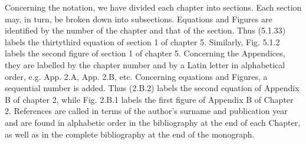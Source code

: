 Concerning the notation, we have divided each chapter into sections. Each section may, in turn, be broken down into subsections. Equations and Figures are identified by the number of the chapter and that of the section. Thus (5.1.33) labels the thirtythird equation of section 1 of chapter 5. Similarly, Fig. 5.1.2 labels the second figure of section 1 of chapter 5. Concerning the Appendices, they are labelled by the chapter number and by a Latin letter in alphabetical order, e.g. App. 2.A, App. 2.B, etc. Concerning equations and Figures, a sequential number is added. Thus (2.B.2) labels the second equation of Appendix B of chapter 2, while Fig. 2.B.1 labels the first figure of Appendix B of Chapter 2. References are called  in terms of the author's surname and publication year and are found in alphabetic order in the bibliography at the end of each Chapter, as well as in the complete bibliography at the end of the monograph.

